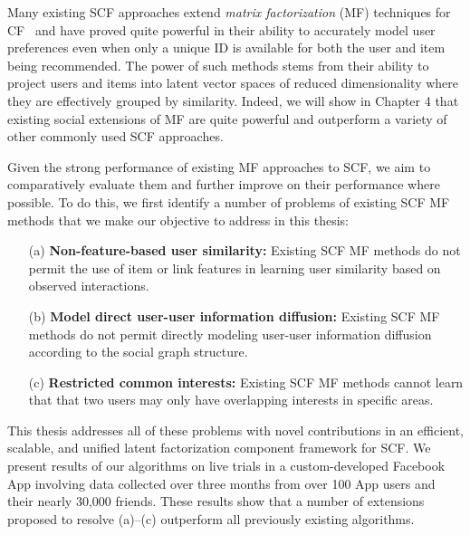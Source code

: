 Many existing SCF approaches extend \emph{matrix factorization} (MF)
techniques for CF~\cite{pmf} and have proved quite powerful in their ability to
accurately model user preferences even when only a unique ID is
available for both the user and item being recommended.  The power of
such methods stems from their ability to project users and items into
latent vector spaces of reduced dimensionality where they are 
effectively grouped by similarity.  Indeed, we will show in
Chapter 4 that existing social extensions of MF are
quite powerful and outperform a variety of other commonly used SCF
approaches.

Given the strong performance of existing MF approaches to SCF, we aim
to comparatively evaluate them and further improve on their
performance where possible.  To do this, we first identify a number of
problems of existing SCF MF methods that we make our objective to
address in this thesis:
\begin{enumerate}
\item[(a)] {\bf Non-feature-based user similarity:} Existing SCF MF
methods do not permit the use of item or link features in learning
user similarity based on observed interactions.
\item[(b)] {\bf Model direct user-user information diffusion:}
Existing SCF MF methods do not permit directly modeling user-user
information diffusion according to the social graph structure.
\item[(c)] {\bf Restricted common interests:} Existing SCF MF methods
cannot learn that that two users may only have overlapping interests
in specific areas.
\end{enumerate}

This thesis addresses all of these problems with novel contributions in
an efficient, scalable, and unified latent factorization component
framework for SCF.  We present results of our algorithms on live
trials in a custom-developed Facebook App involving data collected
over three months from over 100 App users and their nearly 30,000
friends.  These results show that a number of extensions proposed to
resolve (a)--(c) outperform all previously existing algorithms.

